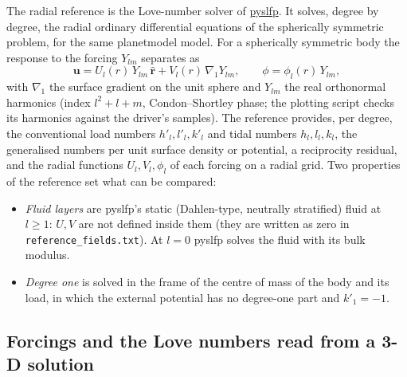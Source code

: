 \documentclass[11pt]{article}
\numberwithin{equation}{section}
\newcommand{\vu}{\mathbf{u}}
\newcommand{\rhat}{\hat{\mathbf{r}}}
\newcommand{\code}[1]{\texttt{#1}}
\newcommand{\gradone}{\nabla_{1}}
\begin{document}
The radial reference is the Love-number solver of
\href{https://github.com/da380/pyslfp}{pyslfp}. It solves, degree by degree,
the radial ordinary differential equations of the spherically symmetric
problem, for the same planetmodel model. For a spherically symmetric body
the response to the forcing $Y_{lm}$ separates as
\begin{equation}
  \vu = U_l(r)\,Y_{lm}\,\rhat + V_l(r)\,\gradone Y_{lm},
  \qquad \phi = \phi_l(r)\,Y_{lm},
  \label{eq:separation}
\end{equation}
with $\gradone$ the surface gradient on the unit sphere and $Y_{lm}$ the
real orthonormal harmonics (index $l^2+l+m$, Condon--Shortley phase; the
plotting script checks its harmonics against the driver's samples). The
reference provides, per degree, the conventional load numbers
$h'_l,l'_l,k'_l$ and tidal numbers $h_l,l_l,k_l$, the generalised numbers
per unit surface density or potential, a reciprocity residual, and the
radial functions $U_l,V_l,\phi_l$ of each forcing on a radial grid. Two
properties of the reference set what can be compared:
\begin{itemize}[leftmargin=*]
\item \emph{Fluid layers} are pyslfp's static (Dahlen-type, neutrally
  stratified) fluid at $l\ge 1$: $U,V$ are not defined inside them (they
  are written as zero in \code{reference\_fields.txt}). At $l=0$ pyslfp
  solves the fluid with its bulk modulus.
\item \emph{Degree one} is solved in the frame of the centre of mass of
  the body and its load, in which the external potential has no degree-one
  part and $k'_1=-1$.
\end{itemize}

\subsection{Forcings and the Love numbers read from a 3-D solution}
\label{sec:lovedef}
\end{document}
